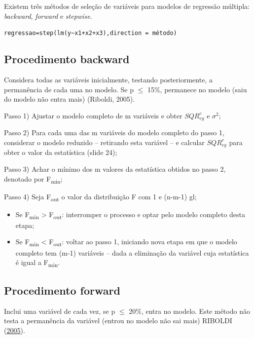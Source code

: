 \documentclass[12pt,brazil,oneside]{book}
\begin{document}
Existem três métodos de seleção de variáveis para modelos de regressão múltipla: \emph{backward}, \emph{forward} e \emph{stepwise}.

\texttt{regressao=step(lm(y\textasciitilde{}x1+x2+x3),direction\ =\ \textquotesingle{}método\textquotesingle{})}

\hypertarget{procedimento-backward}{%
\subsection{Procedimento backward}\label{procedimento-backward}}

Considera todas as variáveis inicialmente, testando posteriormente, a permanência de cada uma no modelo. Se p \(\leq\) 15\%, permanece no modelo (saiu do modelo não entra mais) (Riboldi, 2005).

Passo 1) Ajustar o modelo completo de m variáveis e obter \(SQR^{c}_{eg}\) e \(\sigma^{2}\);

Passo 2) Para cada uma das m variáveis do modelo completo do passo 1, considerar o modelo reduzido -- retirando esta variável
-- e calcular \(SQR^{r}_{eg}\) para obter o valor da estatística (slide 24);

Passo 3) Achar o mínimo dos m valores da estatística obtidos no passo 2, denotado por F\textsubscript{min};

Passo 4) Seja F\textsubscript{out} o valor da distribuição F com 1 e (n-m-1) gl;

\begin{itemize}
\item
  Se F\textsubscript{min} \textgreater{} F\textsubscript{out}: interromper o processo e optar pelo modelo completo desta etapa;
\item
  Se F\textsubscript{min} \textless{} F\textsubscript{out}: voltar ao passo 1, iniciando nova etapa em que o modelo completo tem (m-1) variáveis -- dada a
  eliminação da variável cuja estatística é igual a F\textsubscript{min}.
\end{itemize}

\hypertarget{procedimento-forward}{%
\subsection{Procedimento forward}\label{procedimento-forward}}

Inclui uma variável de cada vez, se p \(\leq\) 20\%, entra no modelo. Este método não testa a permanência da variável (entrou no modelo não sai mais) RIBOLDI (\protect\hyperlink{ref-Riboldi2005}{2005}).
\end{document}
